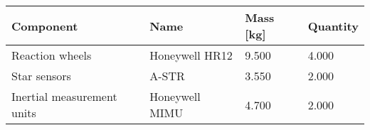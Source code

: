 \begin{tabular}{llll}
\toprule
                  Component &            Name & Mass [kg] & Quantity \\
\midrule
            Reaction wheels &  Honeywell HR12 &     9.500 &    4.000 \\
               Star sensors &           A-STR &     3.550 &    2.000 \\
 Inertial measurement units &  Honeywell MIMU &     4.700 &    2.000 \\
\bottomrule
\end{tabular}
